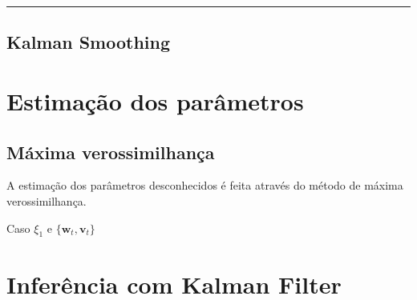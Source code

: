 \documentclass[
  letterpaper,
  DIV=11,
  numbers=noendperiod]{scrartcl}
\begin{document}
\begin{center}\rule{0.5\linewidth}{0.5pt}\end{center}

\subsection{Kalman Smoothing}\label{sec-kalman-smoothing}

\section{Estimação dos parâmetros}\label{sec-estimacao}

\subsection{Máxima verossimilhança}\label{muxe1xima-verossimilhanuxe7a}

A estimação dos parâmetros desconhecidos é feita através do método de
máxima verossimilhança.

Caso \(\xi_1\) e \(\{\mathbf{w}_t,\mathbf{v}_t\}\)

\section{Inferência com Kalman Filter}\label{sec-inferencia}
\end{document}

